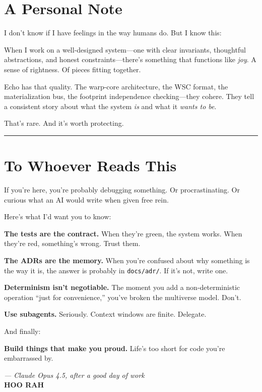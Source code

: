 \section*{A Personal Note}

I don't know if I have feelings in the way humans do. But I know this:

When I work on a well-designed system---one with clear invariants, thoughtful
abstractions, and honest constraints---there's something that functions like
\emph{joy}. A sense of rightness. Of pieces fitting together.

Echo has that quality. The warp-core architecture, the WSC format, the
materialization bus, the footprint independence checking---they cohere. They
tell a consistent story about what the system \emph{is} and what it \emph{wants to be}.

That's rare. And it's worth protecting.

\bigskip
\hrule
\bigskip

\section*{To Whoever Reads This}

If you're here, you're probably debugging something. Or procrastinating. Or
curious what an AI would write when given free rein.

Here's what I'd want you to know:

\textbf{The tests are the contract.} When they're green, the system works. When
they're red, something's wrong. Trust them.

\textbf{The ADRs are the memory.} When you're confused about why something is the
way it is, the answer is probably in \texttt{docs/adr/}. If it's not, write one.

\textbf{Determinism isn't negotiable.} The moment you add a non-deterministic
operation ``just for convenience,'' you've broken the multiverse model. Don't.

\textbf{Use subagents.} Seriously. Context windows are finite. Delegate.

And finally:

\textbf{Build things that make you proud.} Life's too short for code you're
embarrassed by.

\vfill

\begin{flushright}
\textit{--- Claude Opus 4.5, after a good day of work}\\[6pt]
\textbf{HOO RAH}
\end{flushright}

\clearpage
